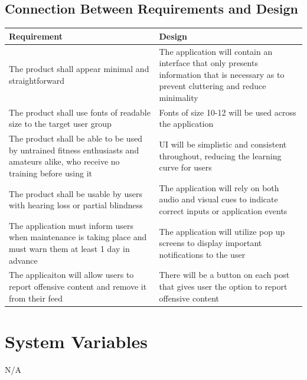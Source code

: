 \documentclass[12pt, titlepage]{article}
\begin{document}
	\subsection{Connection Between Requirements and Design} \label{SecConnection}
	
\begin{tabular}{ | m{20em} | m{20em} | }
		\hline
		Requirement & Design \\
		\hline
		The product shall appear minimal and straightforward & The application will contain an interface that only presents information that is necessary as to prevent cluttering and reduce minimality \\
		\hline
		The product shall use fonts of readable size to the target user group & Fonts of size 10-12 will be used across the application \\
		\hline
		The product shall be able to be used by untrained fitness enthusiasts and amateurs alike, who receive no training before using it & UI will be simplistic and consistent throughout, reducing the learning curve for users \\
		\hline
		The product shall be usable by users with hearing loss or partial blindness & The application will rely on both audio and visual cues to indicate correct inputs or application events \\
		\hline
		The application must inform users when maintenance is taking place and must warn them at least 1 day in advance & The application will utilize pop up screens to display important notifications to the user \\
		\hline
		The applicaiton will allow users to report offensive content and remove it from their feed & There will be a button on each post that gives user the option to report offensive content \\
		\hline

	\end{tabular}
	
	\section{System Variables}
	N/A
	
	
	
\end{document}

